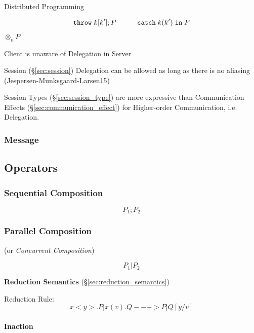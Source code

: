 Distributed Programming

\[
  \mathtt{throw} \; k[k']; P
  \quad\quad\quad
  \mathtt{catch} \; k(k') \; \mathtt{in} \; P
\]

$\otimes_n P$

Client is unaware of Delegation in Server

Session (\S\ref{sec:session}) Delegation can be allowed as long as
there is no aliasing (Jespersen-Munksgaard-Larsen15)

Session Types (\S\ref{sec:session_type}) are more expressive than
Communication Effects (\S\ref{sec:communication_effect}) for
Higher-order Communication, i.e. Delegation. \cite{orchard-yoshida16}




\subsubsection{Message}\label{sec:message}



\subsection{Operators}\label{sec:process_operators}

\subsubsection{Sequential Composition}\label{sec:sequential_composition}

\[
  P_1; P_2
\]



\subsubsection{Parallel Composition}\label{sec:parallel_composition}

(or \emph{Concurrent Composition})

\[
  P_1 | P_2
\]


\textbf{Reduction Semantics} (\S\ref{sec:reduction_semantics})

Reduction Rule:
\[
  x<y>.P | x(v).Q ---> P | Q[y/v]
\]



\paragraph{Inaction}\label{sec:inaction}\hfill

